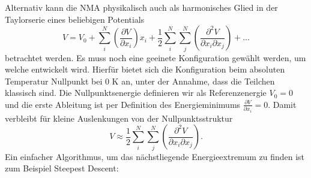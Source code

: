 \documentclass[a4paper,12pt]{article}
\begin{document}
Alternativ kann die NMA physikalisch auch als harmonisches Glied in der Taylorserie eines beliebigen Potentials 
\begin{equation}
 V=V_0+\sum_i^N \left( \frac{\partial V}{\partial x_i} \right) x_i + \frac{1}{2} \sum_i^N \sum_j^N \left( \frac{\partial^2 V}{\partial x_i \partial x_j} \right) + \ldots
\end{equation}
betrachtet werden. Es muss noch eine geeinete Konfiguration gewählt werden, um welche entwickelt wird. Hierfür bietet sich die Konfiguration beim absoluten Temperatur Nullpunkt
bei 0 K an, unter der Annahme, dass die Teilchen klassisch sind. Die Nullpunktsenergie definieren wir als Referenzenergie $V_0=0$ und die erste Ableitung ist per Definition 
des Energieminimums $\frac{\partial V}{\partial x_i}=0$. Damit verbleibt für kleine Auslenkungen von der Nullpunktsstruktur
\begin{equation}
 V\approx\frac{1}{2} \sum_i^N \sum_j^N \left( \frac{\partial^2 V}{\partial x_i \partial x_j} \right).
\end{equation}
Ein einfacher Algorithmus, um das nächstliegende Energieextremum zu finden ist zum Beispiel Steepest Descent:
\end{document}
